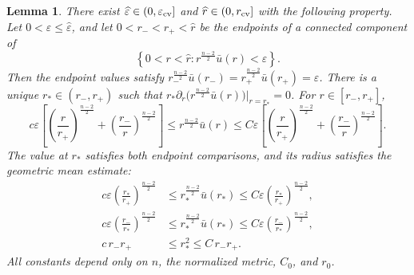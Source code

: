 \documentclass[11pt]{article}
\numberwithin{equation}{section}
\newtheorem{lemma}[theorem]{Lemma}
\theoremstyle{remark}
\newcommand{\pa}{\partial}
\newcommand{\eps}{\varepsilon}
\begin{document}
\par
\begin{lemma}\label{lem:multiplicative-interval}
There exist \(\widehat\eps\in(0,\eps_{\rm cv}]\) and
\(\widehat r\in(0,r_{\rm cv}]\) with the following property. Let
\(0<\eps\le\widehat\eps\), and let \(0<r_-<r_+<\widehat r\) be the endpoints
of a connected component of
\[
 \left\{0<r<\widehat r:
 r^{\frac{n-2}{2}}\bar u(r)<\eps\right\}.
\]
Then the endpoint values satisfy \(r_-^{\frac{n-2}{2}}\bar u(r_-)
 =r_+^{\frac{n-2}{2}}\bar u(r_+)=\eps\).
There is a unique \(r_*\in(r_-,r_+)\) such that \(r_*\pa_r\bigl(r^{\frac{n-2}{2}}\bar u(r)\bigr)\big|_{r=r_*}=0\).
For \(r\in[r_-,r_+]\),
\begin{equation}\label{eq:multiplicative-two-sided}
 c\eps\left[
 \left(\frac r{r_+}\right)^{\frac{n-2}{2}}
 +\left(\frac{r_-}{r}\right)^{\frac{n-2}{2}}
 \right]
 \le r^{\frac{n-2}{2}}\bar u(r)\le
 C\eps\left[
 \left(\frac r{r_+}\right)^{\frac{n-2}{2}}
 +\left(\frac{r_-}{r}\right)^{\frac{n-2}{2}}
 \right].
\end{equation}
The value at \(r_*\) satisfies both endpoint comparisons, and its radius
satisfies the geometric mean estimate:
\begin{equation}\label{eq:multiplicative-midpoint}
 \begin{aligned}
 c\eps\left(\frac{r_*}{r_+}\right)^{\frac{n-2}{2}}
 &\le r_*^{\frac{n-2}{2}}\bar u(r_*)
 \le C\eps\left(\frac{r_*}{r_+}\right)^{\frac{n-2}{2}},\\
 c\eps\left(\frac{r_-}{r_*}\right)^{\frac{n-2}{2}}
 &\le r_*^{\frac{n-2}{2}}\bar u(r_*)
 \le C\eps\left(\frac{r_-}{r_*}\right)^{\frac{n-2}{2}},\\
 c\,r_-r_+
 &\le r_*^2\le C\,r_-r_+.
 \end{aligned}
\end{equation}
All constants depend only on \(n\), the normalized metric, \(C_0\), and
\(r_0\).
\end{lemma}
\end{document}
